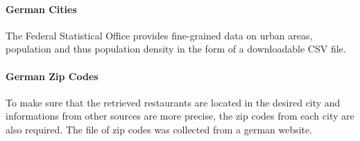 \paragraph{German Cities}
The Federal Statistical Office provides fine-grained data on urban areas, population and thus population density in the form of a downloadable \ac{CSV} file.\cite{destatis}
\paragraph{German Zip Codes}
To make sure that the retrieved \ylp{} restaurants are located in the desired city and informations from other sources are more precise, the zip codes from each city are also required.
The file of zip codes was collected from a german website.\cite{plz}
